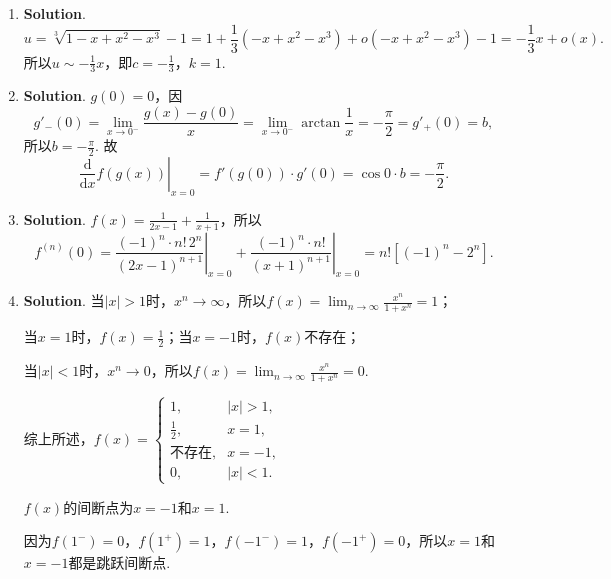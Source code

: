 \documentclass[../main.tex]{subfiles}
\begin{document}
\begin{enumerate}
          由数学归纳法得$\frac{\mathrm{d}^{n} y}{\mathrm{d}x^{n}}=m^{n} t^{m}$，所以$\left
              .\frac{\mathrm{d}^{n} y}{\mathrm{d}x^{n}}\right|_{t=1}=m^{n}$.

    \item \textbf{Solution}.
          \[
              u = \sqrt[3]{1-x+x^{2}-x^{3}}-1 = 1+\frac{1}{3}(-x+x^{2}-x^{3})+o(-x+x^{2}
              -x^{3})-1=-\frac{1}{3}x+o(x).
          \]
          所以$u\sim -\frac{1}{3}x$，即$c=-\frac{1}{3}$，$k=1$.

    \item \textbf{Solution}. $g(0)=0$，因
          \[
              g'_{-}(0)=\lim_{x\to0^-}\frac{g(x)-g(0)}{x}
              =\lim_{x\to0^-}\arctan \frac{1}{x}=-\frac{\pi}{2}=g'_{+}(0)=b,
          \]
          所以$b=-\frac{\pi}{2}$. 故
          \[
              \left.\frac{\mathrm{d}}{\mathrm{d}x}f\left(g(x)\right)\right|_{x=0}=f'(g(0
              ))\cdot g'(0)=\cos 0 \cdot b=-\frac{\pi}{2}.
          \]

    \item \textbf{Solution}. $f(x)=\frac{1}{2x-1}+\frac{1}{x+1}$，所以
          \[
              f^{(n)}(0)=\left.\frac{(-1)^{n}\cdot n!\,2^{n}}{(2x-1)^{n+1}}\right|_{x=0}
              +\left.\frac{(-1)^{n}\cdot n!}{(x+1)^{n+1}}\right|_{x=0}=n!\left[(-1)^{n}
                  -2^{n}\right].
          \]

    \item \textbf{Solution}. 当$|x|>1$时，$x^{n}\to\infty$，所以$f(x)=\lim_{n\to\infty}
              \frac{x^{n}}{1+x^{n}}=1$；

          当$x=1$时，$f(x)=\frac{1}{2}$；当$x=-1$时，$f(x)$不存在；

          当$|x|<1$时，$x^{n}\to0$，所以$f(x)=\lim_{n\to\infty}\frac{x^{n}}{1+x^{n}}=
              0$.

          综上所述，$f(x)=
              \begin{cases}
                  1,           & |x|>1, \\
                  \frac{1}{2}, & x=1,   \\
                  \text{不存在},  & x=-1,  \\
                  0,           & |x|<1.
              \end{cases}$

          $f(x)$的间断点为$x=-1$和$x=1$.

          因为$f(1^{-})=0$，$f(1^{+})=1$，$f(-1^{-})=1$，$f(-1^{+})=0$，所以$x=1$和$x
              =-1$都是跳跃间断点.
\end{enumerate}
\end{document}
